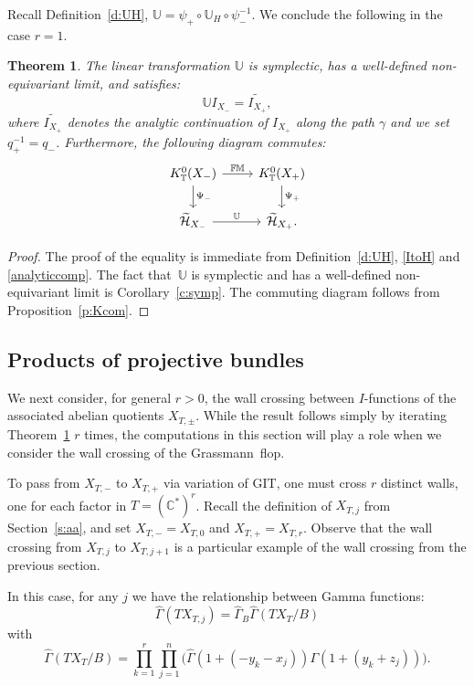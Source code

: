 \documentclass[pdftex]{sigma}
\newtheorem{Theorem}{Theorem}[section]
\numberwithin{equation}{section}
\newcommand{\cc}[1]{\mathcal{#1}} %
\newcommand{\CC}{\mathbb{C}}
\newcommand{\UU}{\mathbb{U}}
\newcommand{\torus}{\mathbb{T}}
\newcommand{\FM}{\mathbb{FM}}
\newcommand{\z}{z}
\newcommand{\x}{x}
\begin{document}
Recall Definition~\ref{d:UH}, $\UU = \psi_{+} \circ \UU_H \circ \psi_{-}^{-1}.$ We conclude the following in the case $r=1.$
\begin{Theorem} \label{t:st}
The linear transformation $\UU$ is symplectic, has a well-defined non-equivariant limit, and satisfies:
\[
\UU I_{X_{-}} =\widetilde{I_{X_{+}}},
\]
where $\widetilde{I_{X_{+}}}$ denotes the analytic continuation of $I_{X_{+}}$ along the path $\gamma$ and we set $q_+^{-1} = q_-$.
Furthermore, the following diagram commutes:
\[
\begin{tikzcd}
K^0_\torus(X_{-}) \ar[r, "\FM"] \ar[d, "\Psi_-"] & K^0_\torus(X_{+}) \ar[d, "\Psi_+"] \\
\widetilde{\cc H}_{X_{-}} \ar[r, "\UU"] & \widetilde{\cc H}_{X_{+}}.
\end{tikzcd}
\]
\end{Theorem}



\begin{proof}
The proof of the equality is immediate from Definition~\ref{d:UH}, \eqref{ItoH} and \eqref{analyticcomp}. The fact that~$\UU$ is symplectic and has a well-defined non-equivariant limit is Corollary~\ref{c:symp}. The commuting diagram follows from Proposition~\ref{p:Kcom}.
\end{proof}

\subsection{Products of projective bundles}
We next consider, for general $r >0$, the wall crossing between $I$-functions of the associated abelian quotients $X_{T, \pm}$. While the result follows simply by iterating Theorem~\ref{t:st} $r$ times, the computations in this section will play a role when we consider the wall crossing of the Grassmann~flop.

To pass from $X_{T, -}$ to $X_{T, +}$ via variation of GIT, one must cross $r$ distinct walls, one for each factor in $T = (\CC^*)^r$.
Recall the definition of $X_{T, j}$ from Section~\ref{s:aa}, and set $X_{T, -} = X_{T, 0}$ and $X_{T, +} = X_{T, r}$.
Observe that the wall crossing from $X_{T, j}$ to $X_{T, j+1}$ is a particular example of the wall crossing from the previous section.

In this case, for any $j$ we have the relationship between Gamma functions:
\[
\hat \Gamma(TX_{T, j})=
\hat \Gamma_{B} \hat \Gamma(TX_T/B)
\]
with
\[
\hat \Gamma(TX_T/B) = \prod_{k=1}^r\prod_{j=1}^n\bigl(
\hat \Gamma(1+(- y_k-\x_j))\Gamma(1+(y_k+\z_j))\bigr).
\]
\end{document}
